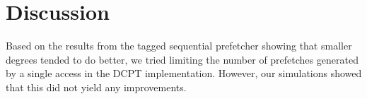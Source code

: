 \section{Discussion}

Based on the results from the tagged sequential prefetcher showing that
smaller degrees tended to do better, we tried limiting the number of
prefetches generated by a single access in the DCPT implementation.
However, our simulations showed that this did not yield any improvements.
